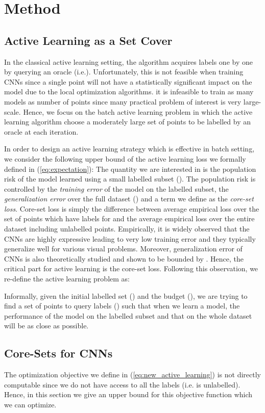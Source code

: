 \documentclass{article} \usepackage{iclr2018_conference,times}
\makeatletter
\newcommand*{\ie}{i.e.\@\xspace}
\makeatother
\begin{document}
\section{Method} 
\subsection{Active Learning as a Set Cover} 
In the classical active learning setting, the algorithm acquires
labels one by one by querying an oracle (\ie ). Unfortunately, this is not feasible when training CNNs since 
a single point will not have a statistically significant impact on the model due to the local optimization algorithms.
 it is infeasible to train as many models as number of points since many practical problem of interest is very
large-scale. Hence, we focus on the batch active learning problem in
which the active learning algorithm choose a moderately large set of points to be labelled by an oracle at each
iteration.

In order to design an active learning strategy which is effective in batch setting, we consider the following upper
bound of the active learning loss we formally defined in (\ref{eq:expectation}):
{ \small 
 }
The quantity we are interested in is the population risk of the model learned using a small labelled subset ().
The population risk is controlled by the \emph{training error} of the model on the labelled subset, the \emph{generalization error} over the
full dataset () and a term we define as the \emph{core-set loss}. Core-set loss is simply the
difference between average empirical loss over the set of points which have labels for and the average empirical loss over the entire
dataset including unlabelled points. Empirically, it is widely observed that the CNNs are highly expressive leading to very low training error and they typically generalize well for various visual problems. Moreover, generalization error of CNNs is also theoretically studied and shown to be bounded by \citet{robust}. Hence, the critical part for active learning is the core-set loss. Following this observation, we re-define the active learning problem as:
 
Informally, given the initial labelled set () and the budget (), we are trying to find a set of points
to query labels () such that when we learn a model, the performance of the model on the labelled subset
and that on the whole dataset will be as close as possible.

\subsection{Core-Sets for CNNs} 
The optimization objective we define in (\ref{eq:new_active_learning}) is not directly computable since we do not have
access to all the labels (\ie  is unlabelled). Hence, in this section we
give an upper bound for this objective function which we can optimize. 
\end{document}
